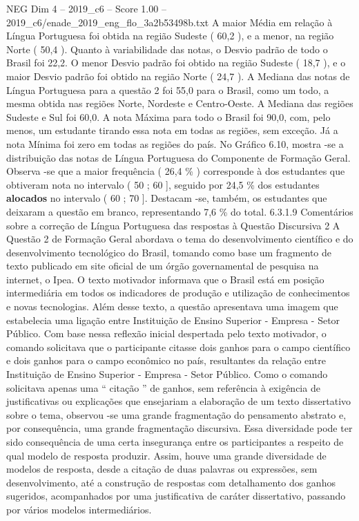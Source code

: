 \begin{textsample}{NEG Dim 4 – 2019\_c6 – Score 1.00 – 2019\_c6/enade\_2019\_eng\_flo\_3a2b53498b.txt}
A maior Média em relação à Língua Portuguesa foi obtida na região Sudeste ( 60,2 ), e a menor, na região Norte ( 50,4 ).
Quanto à variabilidade das notas, o Desvio padrão de todo o Brasil foi 22,2.
O menor Desvio padrão foi obtido na região Sudeste ( 18,7 ), e o maior Desvio padrão foi obtido na região Norte ( 24,7 ).
A Mediana das notas de Língua Portuguesa para a questão 2 foi 55,0 para o Brasil, como um todo, a mesma obtida nas regiões Norte, Nordeste e Centro-Oeste.
A Mediana das regiões Sudeste e Sul foi 60,0.
A nota Máxima para todo o Brasil foi 90,0, com, pelo menos, um estudante tirando essa nota em todas as regiões, sem exceção.
Já a nota Mínima foi zero em todas as regiões do país.
No Gráfico 6.10, mostra -se a distribuição das notas de Língua Portuguesa do Componente de Formação Geral.
Observa -se que a maior frequência ( 26,4 \% ) corresponde à dos estudantes que obtiveram nota no intervalo ( 50 ; 60 ], seguido por 24,5 \% dos estudantes \textbf{alocados} no intervalo ( 60 ; 70 ].
Destacam -se, também, os estudantes que deixaram a questão em branco, representando 7,6 \% do total. 6.3.1.9 Comentários sobre a correção de Língua Portuguesa das respostas à Questão Discursiva 2 A Questão 2 de Formação Geral abordava o tema do desenvolvimento científico e do desenvolvimento tecnológico do Brasil, tomando como base um fragmento de texto publicado em site oficial de um órgão governamental de pesquisa na internet, o Ipea.
O texto motivador informava que o Brasil está em posição intermediária em todos os indicadores de produção e utilização de conhecimentos e novas tecnologias.
Além desse texto, a questão apresentava uma imagem que estabelecia uma ligação entre Instituição de Ensino Superior - Empresa - Setor Público.
Com base nessa reflexão inicial despertada pelo texto motivador, o comando solicitava que o participante citasse dois ganhos para o campo científico e dois ganhos para o campo econômico no país, resultantes da relação entre Instituição de Ensino Superior - Empresa - Setor Público.
Como o comando solicitava apenas uma “ citação ” de ganhos, sem referência à exigência de justificativas ou explicações que ensejariam a elaboração de um texto dissertativo sobre o tema, observou -se uma grande fragmentação do pensamento abstrato e, por consequência, uma grande fragmentação discursiva.
Essa diversidade pode ter sido consequência de uma certa insegurança entre os participantes a respeito de qual modelo de resposta produzir.
Assim, houve uma grande diversidade de modelos de resposta, desde a citação de duas palavras ou expressões, sem desenvolvimento, até a construção de respostas com detalhamento dos ganhos sugeridos, acompanhados por uma justificativa de caráter dissertativo, passando por vários modelos intermediários.

\end{textsample}
